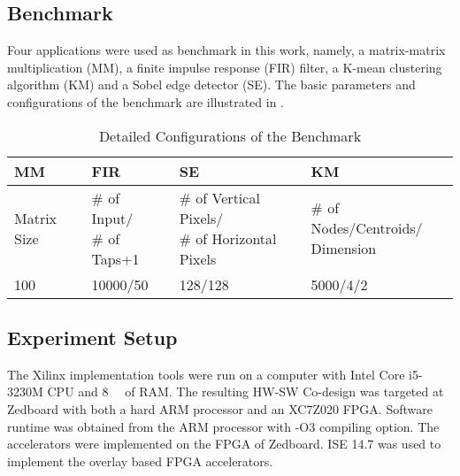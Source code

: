 
\subsection{Benchmark} \label{subsec:benchmark}
Four applications were used as benchmark in this work, namely, a matrix-matrix multiplication (MM), a finite impulse response (FIR) filter, a K-mean clustering algorithm (KM) and a Sobel edge detector (SE). The basic parameters and configurations of the benchmark are illustrated in . 

\begin{table}[htb]
    \footnotesize
    \centering
    \caption{Detailed Configurations of the Benchmark 
    \label{tab:benchmark-config}}{
        \centering
            \begin{tabular}{l|l|l|l}
                \hline
                MM & FIR & SE & KM \\ \hline
                Matrix Size & \tabincell{l}{\# of Input/ \\ \# of Taps+1} & \tabincell{l}{ \# of Vertical Pixels/ \\ \# of Horizontal Pixels} & \tabincell{l}{\# of Nodes/Centroids/ \\ Dimension} \\ \hline
                100 & 10000/50 & 128/128 & 5000/4/2  \\ \hline
            \end{tabular}
        }
\end{table}

\subsection{Experiment Setup} \label{subsec:setup}
The Xilinx implementation tools were run on a computer with Intel Core i5-3230M CPU and \SI{8}{\giga\byte} of RAM. The resulting HW-SW Co-design was targeted at Zedboard with both a hard ARM processor and an XC7Z020 FPGA. Software runtime was obtained from the ARM processor with -O3 compiling option. The accelerators were implemented on the FPGA of Zedboard. ISE 14.7 was used to implement the overlay based FPGA accelerators. 

